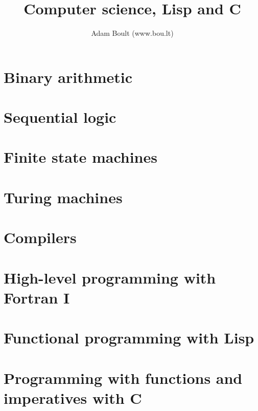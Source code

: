\documentclass[oneside]{book}
\begin{document}
\author{Adam Boult (www.bou.lt)}
\title{Computer science, Lisp and C}
\maketitle

\setcounter{tocdepth}{0}
\tableofcontents



\part{Binary arithmetic}




\part{Sequential logic}



\part{Finite state machines}



\part{Turing machines}








\part{Compilers}


\part{High-level programming with Fortran I}




\part{Functional programming with Lisp}





\part{Programming with functions and imperatives with C}







\end{document}
